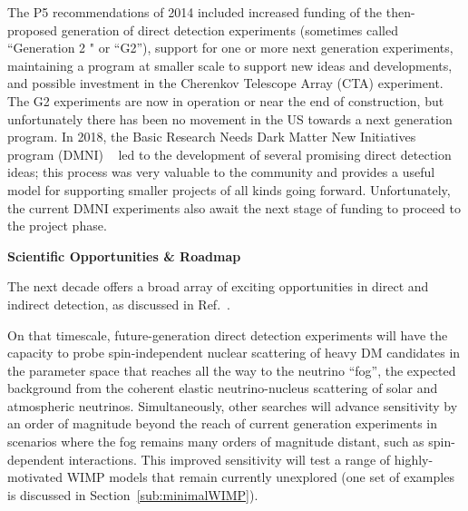 \documentclass[nofootinbib]{article}
\begin{document}
The P5 recommendations of 2014 included increased funding of the then-proposed generation of direct detection experiments (sometimes called ``Generation 2
" or ``G2''), support for one or more next generation experiments, maintaining a program at smaller scale to support new ideas and developments, and possible investment in the Cherenkov Telescope Array (CTA) experiment. The G2 experiments are now in operation or near the end of construction, but unfortunately there has been no movement in the US towards a next generation program. In 2018, the Basic Research Needs Dark Matter New Initiatives program (DMNI) ~\cite{BRNreport} led to the development of several promising direct detection ideas; this process was very valuable to the community and provides a useful model for supporting smaller projects of all kinds going forward. Unfortunately, the current DMNI experiments also await the next stage of funding to proceed to the project phase.  

\vspace{1em}
\noindent \textbf{Scientific Opportunities \& Roadmap} 

The next decade offers a broad array of exciting opportunities in direct and indirect detection, as discussed in Ref.~\cite{Cooley:2022ufh}.

On that timescale, future-generation direct detection experiments will have the capacity to probe spin-independent nuclear scattering of heavy DM candidates in the parameter space that reaches all the way to the neutrino ``fog'', the expected background from the coherent elastic neutrino-nucleus scattering of solar and atmospheric neutrinos. Simultaneously, other searches will advance sensitivity by an order of magnitude beyond the reach of current generation experiments in scenarios where the fog remains many orders of magnitude distant, such as spin-dependent interactions. This improved sensitivity will test a range of highly-motivated WIMP models that remain currently unexplored (one set of examples is discussed in Section~\ref{sub:minimalWIMP}). 
\end{document}
